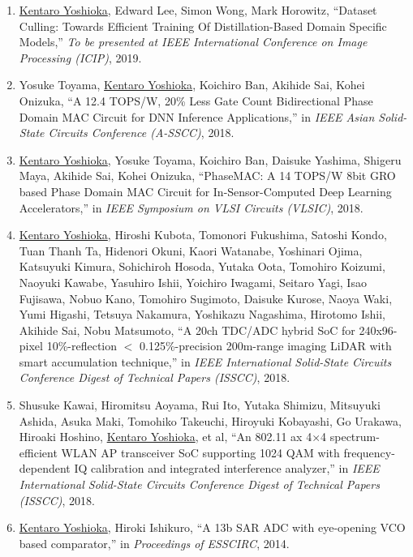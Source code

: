 \begin{enumerate}
\item	\underline{Kentaro Yoshioka}, Edward Lee, Simon Wong, Mark Horowitz, “Dataset Culling: Towards Efficient Training Of Distillation-Based Domain Specific Models,” \textit{To be presented at IEEE International Conference on Image Processing (ICIP)}, 2019.

\item Yosuke Toyama, \underline{Kentaro Yoshioka}, Koichiro Ban, Akihide Sai, Kohei Onizuka, “A 12.4 TOPS/W, 20\% Less Gate Count Bidirectional Phase Domain MAC Circuit for DNN Inference Applications,” in \textit{IEEE Asian  Solid-State  Circuits Conference (A-SSCC)}, 2018.

\item	\underline{Kentaro Yoshioka}, Yosuke Toyama, Koichiro Ban, Daisuke Yashima, Shigeru Maya, Akihide Sai, Kohei Onizuka, “PhaseMAC: A 14 TOPS/W 8bit GRO based Phase Domain MAC Circuit for In-Sensor-Computed Deep Learning Accelerators,” in \textit{IEEE Symposium on VLSI Circuits (VLSIC)}, 2018.

\item	\underline{Kentaro Yoshioka}, Hiroshi Kubota, Tomonori Fukushima, Satoshi Kondo, Tuan Thanh Ta, Hidenori Okuni, Kaori Watanabe, Yoshinari Ojima, Katsuyuki Kimura, Sohichiroh Hosoda, Yutaka Oota, Tomohiro Koizumi, Naoyuki Kawabe, Yasuhiro Ishii, Yoichiro Iwagami, Seitaro Yagi, Isao Fujisawa, Nobuo Kano, Tomohiro Sugimoto, Daisuke Kurose, Naoya Waki, Yumi Higashi, Tetsuya Nakamura, Yoshikazu Nagashima, Hirotomo Ishii, Akihide Sai, Nobu Matsumoto, “A 20ch TDC/ADC hybrid SoC for 240x96-pixel 10\%-reflection $<$ 0.125\%-precision 200m-range imaging LiDAR with smart accumulation technique,” in \textit{IEEE International  Solid-State  Circuits  Conference  Digest  of  Technical Papers (ISSCC)}, 2018.

\item	Shusuke Kawai, Hiromitsu Aoyama, Rui Ito, Yutaka Shimizu, Mitsuyuki Ashida, Asuka Maki, Tomohiko Takeuchi, Hiroyuki Kobayashi, Go Urakawa, Hiroaki Hoshino, \underline{Kentaro Yoshioka}, et al, “An 802.11 ax 4×4 spectrum-efficient WLAN AP transceiver SoC supporting 1024 QAM with frequency-dependent IQ calibration and integrated interference analyzer,” in \textit{IEEE International  Solid-State  Circuits  Conference  Digest  of  Technical Papers (ISSCC)}, 2018.

\item	\underline{Kentaro Yoshioka}, Hiroki Ishikuro, “A 13b SAR ADC with eye-opening VCO based comparator,” in \textit{Proceedings of ESSCIRC}, 2014.


\end{enumerate}
